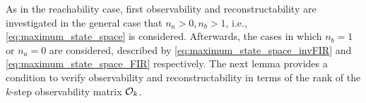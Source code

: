 As in the reachability case, first observability and reconstructability are investigated in the general case that $n_ a> 0,n_b>1$, i.e., \eqref{eq:maximum_state_space} is considered. Afterwards, the cases in which $n_b=1$ or $n_a =0$ are considered, described by \eqref{eq:maximum_state_space_invFIR} and \eqref{eq:maximum_state_space_FIR} respectively. The next lemma provides a condition to verify observability and reconstructability in terms of the rank of the $k$-step observability matrix $\mathcal{O}_k$. 


